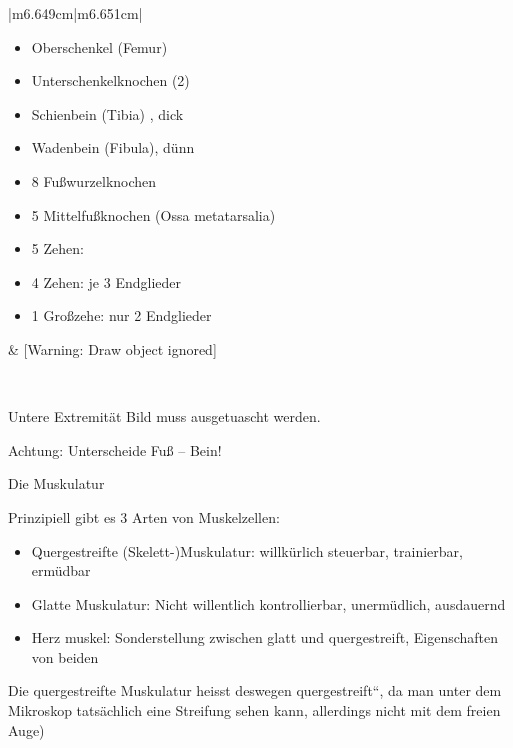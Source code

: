 \documentclass{article}
\begin{document}
\begin{center}
\tablehead{}\begin{supertabular}{|m{6.649cm}|m{6.651cm}|}
\hline
\begin{itemize}
\item Oberschenkel  (Femur)

\item Unterschenkelknochen (2)

\end{itemize}
\begin{itemize}
\item Schienbein  (Tibia) , dick

\item Wadenbein  (Fibula), d\"unn

\end{itemize}
\begin{itemize}
\item 8 Fu{\ss}wurzelknochen

\item 5 Mittelfu{\ss}knochen  (Ossa metatarsalia)

\item 5 Zehen:

\end{itemize}
\begin{itemize}
\item 4 Zehen: je 3  Endglieder

\item 1 Gro{\ss}zehe: nur 2 Endglieder

\end{itemize}
 &
\centering %
%
[Warning: Draw object ignored]\par

\\\hline
\end{supertabular}
\end{center}
Untere Extremit\"at Bild muss ausgetuascht werden.

Achtung: Unterscheide Fu{\ss} -- Bein!

Die Muskulatur

Prinzipiell gibt es 3  Arten von Muskelzellen:

\begin{itemize}
\item Quergestreifte (Skelett-)Muskulatur: willk\"urlich steuerbar,
trainierbar, er\-m\"ud\-bar

\item Glatte  Muskulatur: Nicht willentlich kontrollierbar,
unerm\"udlich, ausdauernd 

\item Herz muskel: Sonderstellung zwischen glatt und quergestreift,
Eigenschaften von beiden

\end{itemize}
Die quergestreifte Muskulatur heisst deswegen
{\quotedblbase}quergestreift{\textquotedblleft}, da man unter dem
Mikroskop tats\"achlich eine Streifung sehen kann, allerdings nicht mit
dem freien Auge) 
\end{document}
